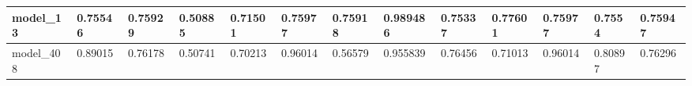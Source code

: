 \begin{tabular}{|l|l|l|l|l|l|l|l|l|l|l|l|l|}
model\_13      & 0.75546     & 0.75929        & 0.50885      & 0.71501          & 0.75977              & 0.75918              & 0.989486     & 0.75337           & 0.77601            & 0.75977         & 0.7554      & 0.75947      \\ \hline
model\_408     & 0.89015     & 0.76178        & 0.50741      & 0.70213          & 0.96014              & 0.56579              & 0.955839     & 0.76456           & 0.71013            & 0.96014         & 0.80897     & 0.76296      \\ \hline
\end{tabular}